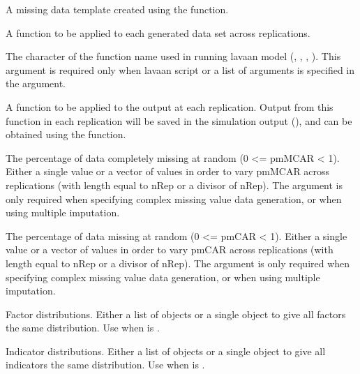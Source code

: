 \documentclass[a4paper]{book}
\begin{document}
\begin{Arguments}
\begin{ldescription}
\item[\code{miss}] 
A missing data template created using the  function.

\item[\code{datafun}] 
A function to be applied to each generated data set across replications.

\item[\code{lavaanfun}] 
The character of the function name used in running lavaan model (, , , ). This argument is required only when lavaan script or a list of arguments is specified in the  argument.

\item[\code{outfun}] 
A function to be applied to the  output at each replication. Output from this function in each replication will be saved in the simulation output (), and can be obtained using the  function.

\item[\code{pmMCAR}] 
The percentage of data completely missing at random (0 <= pmMCAR < 1). Either a single value or a vector of values in order to vary pmMCAR across replications (with length equal to nRep or a divisor of nRep). The  argument is only required when specifying complex missing value data generation, or when using multiple imputation. 

\item[\code{pmMAR}] 
The percentage of data missing at random (0 <= pmCAR < 1). Either a single value or a vector of values in order to vary pmCAR across replications (with length equal to nRep or a divisor of nRep). The  argument is only required when specifying complex missing value data generation, or when using multiple imputation. 


\item[\code{facDist}]  
Factor distributions. Either a list of  objects or a single  object to give all factors the same distribution. Use when  is .

\item[\code{indDist}]  
Indicator distributions. Either a list of  objects or a single  object to give all indicators the same distribution. Use when  is .


\end{ldescription}
\end{Arguments}
\end{document}

